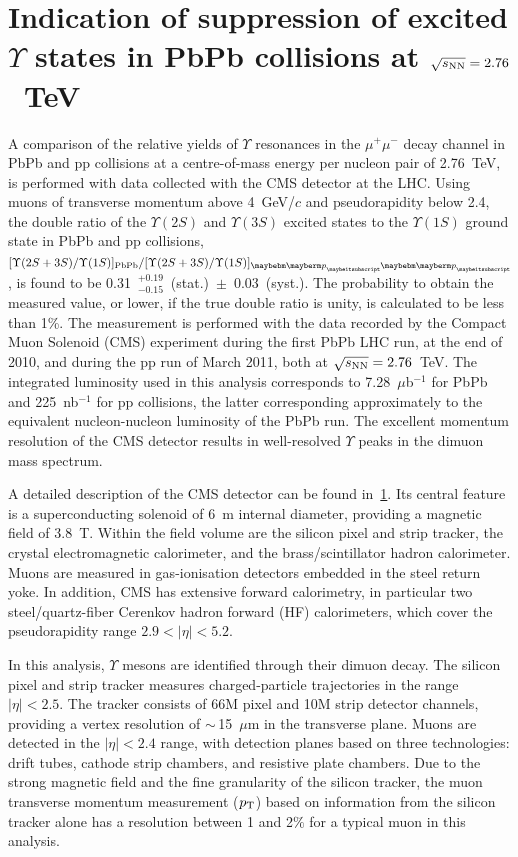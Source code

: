 \section{Indication of suppression of excited $\Upsilon$ states in PbPb collisions at $\sqrt{s_{\rm NN}} = 2.76$~TeV}
\label{sec:YDoubleRatio2010}
A comparison of the relative yields of $\Upsilon$ resonances in the $\mu^+\mu^-$ decay channel in PbPb and pp collisions at a centre-of-mass energy per nucleon pair 
of 2.76~TeV, is performed with data collected with the CMS detector at the LHC. Using muons of transverse momentum above 4~GeV/$c$ and pseudorapidity below 2.4, 
the double ratio of the $\Upsilon(2S)$ and $\Upsilon(3S)$ excited states to the $\Upsilon(1S)$ ground state in PbPb and pp collisions, 
$[\Upsilon(2S+3S)/\Upsilon(1S)]_{\rm PbPb} / [\Upsilon(2S+3S)/\Upsilon(1S)]_{\Pp\Pp}$, is found to be 0.31~$_{-0.15}^{+0.19}$~(stat.)~$\pm$~0.03~(syst.). 
The probability to obtain the measured value, or lower, if the true double ratio is unity, is calculated to be less than 1\%.
The measurement is performed with the data recorded by the Compact Muon Solenoid (CMS) experiment during the first PbPb LHC run, at the end of 2010, and during the 
pp run of March 2011, both at $\sqrt{s_{\rm NN}} = 2.76$~TeV. The integrated luminosity used in this analysis corresponds to 7.28~$\mu$b$^{-1}$ for PbPb and 
225~nb$^{-1}$ for pp collisions, the latter corresponding approximately to the equivalent nucleon-nucleon luminosity of the PbPb run. 
The excellent momentum resolution of the CMS detector results in well-resolved $\Upsilon$ peaks in the dimuon mass spectrum. 

A detailed description of the CMS detector can be found in~\ref{sec:YDoubleRatio2010}. Its central feature is a superconducting solenoid of 6~m internal diameter, 
providing a magnetic field of 3.8~T. Within the field volume are the silicon pixel and strip tracker, the crystal electromagnetic calorimeter, and the 
brass/scintillator hadron calorimeter. Muons are measured in gas-ionisation detectors embedded in the steel return yoke. In addition, 
CMS has extensive forward calorimetry, in particular two steel/quartz-fiber Cerenkov hadron forward (HF) calorimeters, which cover the pseudorapidity 
range $2.9 < |\eta| < 5.2$.

In this analysis, $\Upsilon$ mesons are identified through their dimuon decay. The silicon pixel and strip tracker measures charged-particle 
trajectories in the  range $|\eta| < 2.5$. The tracker consists of 66M pixel and 10M strip detector channels, providing a vertex resolution of 
$\sim$\,15~$\mu$m in the transverse plane. Muons are detected in the $|\eta| < 2.4$ range, with detection planes based on three technologies: 
drift tubes, cathode strip chambers, and resistive plate chambers. Due to the strong magnetic field and the fine granularity of the silicon tracker, 
the muon transverse momentum measurement ($p_{\rm T}$) based on information from the silicon tracker alone has a resolution between 
1 and 2$\%$ for a typical muon in this analysis.

